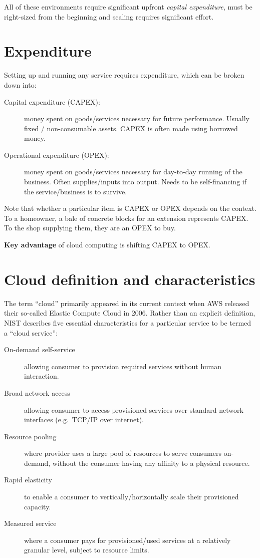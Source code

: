 All of these environments require significant upfront \emph{capital
expenditure}, must be right-sized from the beginning and scaling
requires significant effort.

\section{Expenditure}
\label{sec:expenditure}

Setting up and running any service requires expenditure, which can be
broken down into:

\begin{description}
\item[Capital expenditure (CAPEX):]
money spent on goods/services necessary for future performance. Usually
fixed / non-consumable assets. CAPEX is often made using borrowed money.
\item[Operational expenditure (OPEX):]
money spent on goods/services necessary for day-to-day running of the
business. Often supplies/inputs into output. Needs to be self-financing
if the service/business is to survive.
\end{description}

Note that whether a particular item is CAPEX or OPEX depends on the
context. To a homeowner, a bale of concrete blocks for an extension
represents CAPEX. To the shop supplying them, they are an OPEX to buy.

\textbf{Key advantage} of cloud computing is shifting CAPEX to OPEX.

\section{Cloud definition and characteristics}
\label{sec:essential-characteristics}

The term ``cloud'' primarily appeared in its current context when AWS
released their so-called Elastic Compute Cloud in 2006. Rather than an
explicit definition, NIST describes five essential characteristics for a
particular service to be termed a ``cloud service'':

\begin{description}
\item[On-demand self-service]
allowing consumer to provision required services without human
interaction.
\item[Broad network access]
allowing consumer to access provisioned services over standard network
interfaces (e.g.~TCP/IP over internet).
\item[Resource pooling]
where provider uses a large pool of resources to serve consumers
on-demand, without the consumer having any affinity to a physical
resource.
\item[Rapid elasticity]
to enable a consumer to vertically/horizontally scale their provisioned
capacity.
\item[Measured service]
where a consumer pays for provisioned/used services at a relatively
granular level, subject to resource limits.
\end{description}


